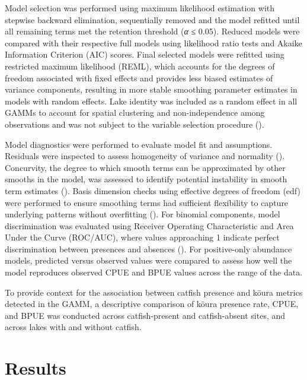 \documentclass[
  letterpaper,
  DIV=11,
  numbers=noendperiod]{scrartcl}
\begin{document}
Model selection was performed using maximum likelihood estimation with
stepwise backward elimination, sequentially removed and the model
refitted until all remaining terms met the retention threshold (\emph{α}
≤ 0.05). Reduced models were compared with their respective full models
using likelihood ratio tests and Akaike Information Criterion (AIC)
scores. Final selected models were refitted using restricted maximum
likelihood (REML), which accounts for the degrees of freedom associated
with fixed effects and provides less biased estimates of variance
components, resulting in more stable smoothing parameter estimates in
models with random effects. Lake identity was included as a random
effect in all GAMMs to account for spatial clustering and
non-independence among observations and was not subject to the variable
selection procedure ().

Model diagnostics were performed to evaluate model fit and assumptions.
Residuals were inspected to assess homogeneity of variance and normality
(). Concurvity, the degree to
which smooth terms can be approximated by other smooths in the model,
was assessed to identify potential instability in smooth term estimates
(). Basis dimension checks using
effective degrees of freedom (edf) were performed to ensure smoothing
terms had sufficient flexibility to capture underlying patterns without
overfitting (). For binomial
components, model discrimination was evaluated using Receiver Operating
Characteristic and Area Under the Curve (ROC/AUC), where values
approaching 1 indicate perfect discrimination between presences and
absences (). For
positive-only abundance models, predicted versus observed values were
compared to assess how well the model reproduces observed CPUE and BPUE
values across the range of the data.

To provide context for the association between catfish presence and
kōura metrics detected in the GAMM, a descriptive comparison of kōura
presence rate, CPUE, and BPUE was conducted across catfish-present and
catfish-absent sites, and across lakes with and without catfish.

\section{Results}\label{results}
\end{document}
